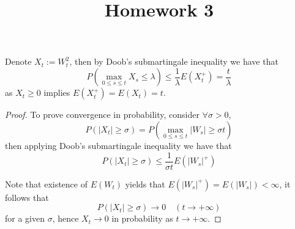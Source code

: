 \documentclass{homework}
\title{Homework 3}
\begin{document}
    \maketitle

    \problem
    Denote $X_t:=W_t^2$, then by Doob's submartingale inequality
    we have that
    \[P\left(\max_{0\leq s\leq t}X_s\leq\lambda\right)
    \leq\frac{1}{\lambda}E(X_t^+)=\frac{t}{\lambda}\]
    as $X_t\geq 0$ implies $E(X_t^+)=E(X_t)=t$.

    \problem
    \begin{proof}
        To prove convergence in probability, consider
        $\forall\sigma>0$,
        \[P(|X_t|\geq\sigma)
        =P\left(\max_{0\leq s\leq t}|W_s|\geq\sigma t\right)\]
        then applying Doob's submartingale inequality we have that
        \[P(|X_t|\geq\sigma)\leq\frac{1}{\sigma t}E(|W_s|^+)\]

        Note that existence of $E(W_t)$ yields that
        $E(|W_s|^+)=E(|W_s|)<\infty$, it follows that
        \[P(|X_t|\geq\sigma)\to 0\quad (t\to +\infty)\]
        for a given $\sigma$, hence $X_t\to 0$ in probability
        as $t\to +\infty$.
    \end{proof}
\end{document}
